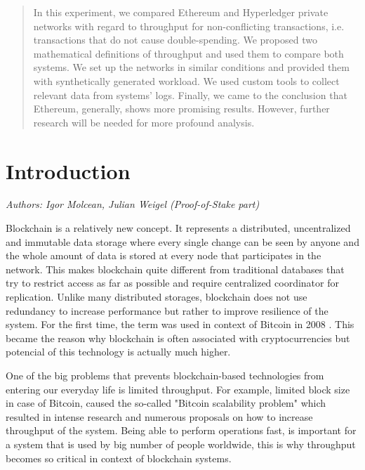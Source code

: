 \documentclass[12pt]{article}
\begin{document}

\tableofcontents
\pagebreak


\begin{abstract}
In this experiment, we compared Ethereum and Hyperledger private networks with regard to throughput for non-conflicting transactions, i.e. transactions that do not cause double-spending. We proposed two mathematical definitions of throughput and used them to compare both systems. We set up the networks in similar conditions and provided them with synthetically generated workload. We used custom tools to collect relevant data from systems’ logs. Finally, we came to the conclusion that Ethereum, generally, shows more promising results. However, further research will be needed for more profound analysis.
\end{abstract}

\newpage
\section{Introduction}
\textit{Authors: Igor Molcean, Julian Weigel (Proof-of-Stake part)}

Blockchain is a relatively new concept. It represents a distributed, uncentralized and immutable data storage where every single change can be seen by anyone and the whole amount of data is stored at every node that participates in the network. This makes blockchain quite different from traditional databases that try to restrict access as far as possible and require centralized coordinator for replication. Unlike many distributed storages, blockchain does not use redundancy to increase performance but rather to improve resilience of the system. For the first time, the term was used in context of Bitcoin in 2008 \cite{bitcoin}. This became the reason why blockchain is often associated with cryptocurrencies but potencial of this technology is actually much higher.

One of the big problems that prevents blockchain-based technologies from entering our everyday life is limited throughput. For example, limited block size in case of Bitcoin, caused the so-called "Bitcoin scalability problem" which resulted in intense research \cite{bitcoin_scaling} and numerous proposals on how to increase throughput of the system. Being able to perform operations fast, is important for a system that is used by big number of people worldwide, this is why throughput becomes so critical in context of blockchain systems.
\end{document}

